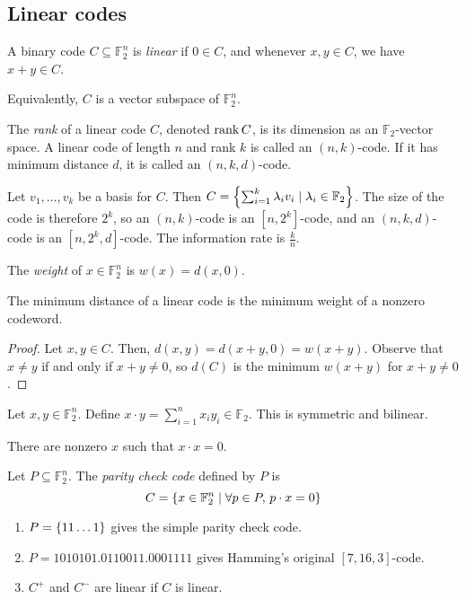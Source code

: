 \subsection{Linear codes}
\begin{definition}
    A binary code \( C \subseteq \mathbb F_2^n \) is \emph{linear} if \( 0 \in C \), and whenever \( x, y \in C \), we have \( x + y \in C \).
\end{definition}
Equivalently, \( C \) is a vector subspace of \( \mathbb F_2^n \).
\begin{definition}
    The \emph{rank} of a linear code \( C \), denoted \( \rank C \), is its dimension as an \( \mathbb F_2 \)-vector space.
    A linear code of length \( n \) and rank \( k \) is called an \( (n,k) \)-code.
    If it has minimum distance \( d \), it is called an \( (n,k,d) \)-code.
\end{definition}
Let \( v_1, \dots, v_k \) be a basis for \( C \).
Then \( C = \qty{\sum_{i=1}^k \lambda_i v_i \mid \lambda_i \in \mathbb F_2} \).
The size of the code is therefore \( 2^k \), so an \( (n,k) \)-code is an \( [n,2^k] \)-code, and an \( (n,k,d) \)-code is an \( [n,2^k,d] \)-code.
The information rate is \( \frac{k}{n} \).
\begin{definition}
    The \emph{weight} of \( x \in \mathbb F_2^n \) is \( w(x) = d(x,0) \).
\end{definition}
\begin{lemma}
    The minimum distance of a linear code is the minimum weight of a nonzero codeword.
\end{lemma}
\begin{proof}
    Let \( x, y \in C \).
    Then, \( d(x,y) = d(x+y,0) = w(x+y) \).
    Observe that \( x \neq y \) if and only if \( x + y \neq 0 \), so \( d(C) \) is the minimum \( w(x+y) \) for \( x + y \neq 0 \).
\end{proof}
\begin{definition}
    Let \( x, y \in \mathbb F_2^n \).
    Define \( x \cdot y = \sum_{i=1}^n x_i y_i \in \mathbb F_2 \).
    This is symmetric and bilinear.
\end{definition}
There are nonzero \( x \) such that \( x \cdot x = 0 \).
\begin{definition}
    Let \( P \subseteq \mathbb F_2^n \).
    The \emph{parity check code} defined by \( P \) is
    \[ C = \qty{x \in \mathbb F_2^n \mid \forall p \in P,\,p \cdot x = 0} \]
\end{definition}
\begin{example}
    \begin{enumerate}
        \item \( P = \qty{11\dots 1} \) gives the simple parity check code.
        \item \( P = \qty{1010101, 0110011, 0001111} \) gives Hamming's original \( [7,16,3] \)-code.
        \item \( C^+ \) and \( C^- \) are linear if \( C \) is linear.
    \end{enumerate}
\end{example}
